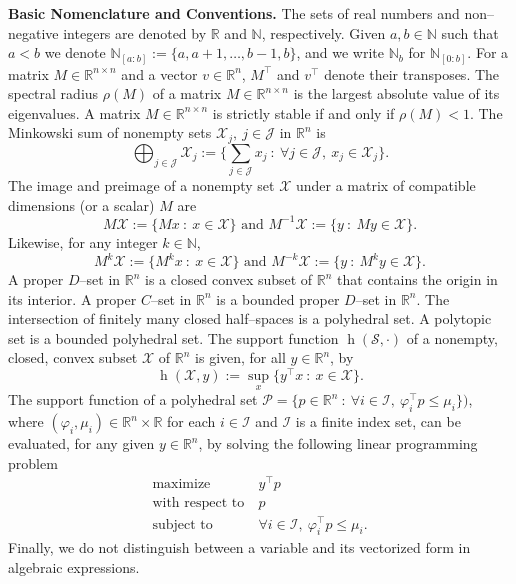 \documentclass[twocolumn]{autart}
\newcommand{\mb}[1]{\mathbb{#1}}
\newcommand{\mc}[1]{\mathcal{#1}}
\newcommand{\N}{\mb{N}}
\newcommand{\R}{\mb{R}}
\newcommand{\Rnm}[2]{\R^{{#1}\times{#2}}}
\newcommand{\support}[2]{\operatorname{h}(#1,#2)}
\newcommand{\supportbb}[1]{\operatorname{h}(#1,\cdot)}
\numberwithin{equation}{section}
\begin{document}
\textbf{Basic Nomenclature and Conventions.}
The sets of real numbers and non--negative integers are denoted by $\R$ and $\N$, respectively. Given $a, b\in\N$ such that $a<b$ we denote $\N_{[a:b]} :=\{a, a + 1, \dots, b-1, b\}$, and we write $\N_b$ for $\N_{[0:b]}$. For a matrix $M\in \Rnm{n}{n}$ and a vector $v\in\R^n$, $M^\top$ and $v^\top$ denote their transposes. The spectral radius $\rho(M)$ of a matrix $M\in \Rnm{n}{n}$ is the largest absolute value of its eigenvalues. A matrix $M\in \Rnm{n}{n}$ is strictly stable if and only if $\rho(M)<1$.  The Minkowski sum of nonempty sets $\mc{X}_j,\ j\in\mc{J}$ in $\R^n$ is
\begin{equation*}
\bigoplus_{j\in\mc{J}} \mc{X}_j:= \{\sum_{j\in\mc{J}}x_j\ :\ \forall j\in\mc{J},\ x_j\in\mc{X}_j\}.
\end{equation*}
The image and preimage of a nonempty set $\mc{X}$ under a matrix of compatible dimensions (or a scalar) $M$ are
\begin{equation*}
M\mc{X}:=\{Mx\ :\ x\in \mc{X}\}\text{ and }M^{-1}\mc{X}:=\{y\ :\ My\in \mc{X}\}.
\end{equation*} 
Likewise, for any integer $k\in\N$,
\begin{equation*}
M^k\mc{X}:=\{M^kx\ :\ x\in \mc{X}\}\text{ and }M^{-k}\mc{X}:=\{y\ :\ M^ky\in \mc{X}\}.
\end{equation*} 
A proper $D$--set in $\R^n$ is a closed convex subset of $\R^n$ that contains the origin in its interior. A proper $C$--set in $\R^n$ is a bounded proper $D$--set in $\R^n$. The intersection of finitely many closed half--spaces is a polyhedral set. A polytopic set is a bounded polyhedral set. 
The support function $\supportbb{\mc{S}}$ of a nonempty, closed, convex subset $\mc{X}$ of $\R^n$ is given, for all $y\in\R^n$, by
\begin{equation*}
\support{\mc{X}}{y}:= \sup_x \{y^\top x\ :\ x\in \mc{X}\}.
\end{equation*} 
The support function of a polyhedral set $\mc{P}=\{p\in\R^n\ :\ \forall i\in\mc{I},\ \varphi_i^\top p\le \mu_i\})$, where $(\varphi_i,\mu_i)\in\R^n\times \R$ for each $i\in\mc{I}$ and $\mc{I}$ is a finite index set, can be evaluated, for any given $y\in\R^n$, by solving the following linear programming problem
\begin{align*}
\text{maximize}\ &y^\top p\\
\text{with respect to}\ &p\\
\text{subject to}\ & \forall i\in\mc{I},\ \varphi_i^\top p\le \mu_i.
\end{align*}
 Finally, we do not distinguish between a variable and its vectorized form in algebraic expressions.
\end{document}
